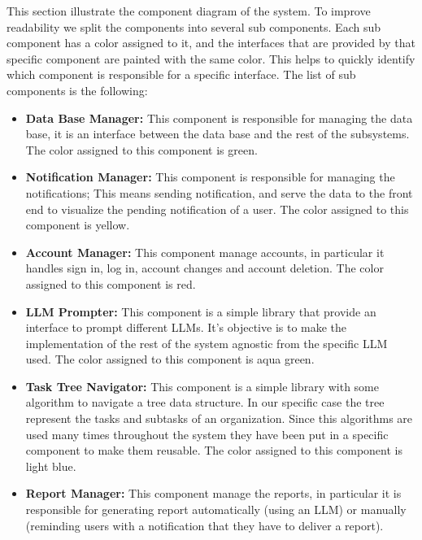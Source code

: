 \documentclass{article}
\begin{document}
This section illustrate the component diagram of the system. To improve readability we split the components into several sub
components.
Each sub component has a color assigned to it, and the interfaces that are provided by that specific component are painted with the same color.
This helps to quickly identify which component is responsible for a specific interface.
\newline \newline
The list of sub components is the following:
\begin{itemize}
    \item \textcolor[HTML]{8CC86E}{\textbf{Data Base Manager: }} This component is responsible for managing the data base, it is an interface between
          the data base and the rest of the subsystems. The color assigned to this component is \textcolor[HTML]{8CC86E}{green}.
    \item \textcolor[HTML]{F0C832}{\textbf{Notification Manager: }} This component is responsible for managing the notifications;
          This means sending notification, and serve the data to the front end to visualize the pending notification of a user. The color assigned to this component is \textcolor[HTML]{F0C832}{yellow}.
    \item \textcolor[HTML]{FF0000}{\textbf{Account Manager: }} This component manage accounts, in particular it handles sign in, log in, account changes and account deletion.
          The color assigned to this component is \textcolor[HTML]{FF0000}{red}.
    \item \textcolor[HTML]{64C8BE}{\textbf{LLM Prompter: }} This component is a simple library that provide an interface to prompt different LLMs. It's objective is to make the
          implementation of the rest of the system agnostic from the specific LLM used. The color assigned to this component is \textcolor[HTML]{64C8BE}{aqua green}.
    \item \textcolor[HTML]{A0C8F0}{\textbf{Task Tree Navigator: }} This component is a simple library with some algorithm to navigate a tree data structure.
          In our specific case the tree represent the tasks and subtasks of an organization. Since this algorithms are used many
          times throughout the system they have been put in a specific component to make them reusable. The color assigned to this component is \textcolor[HTML]{A0C8F0}{light blue}.
    \item \textcolor[HTML]{FA9646}{\textbf{Report Manager: }} This component manage the reports, in particular it is responsible for generating report automatically (using an LLM) or manually (reminding users with a notification that they have to deliver a report).

\end{itemize}
\end{document}
